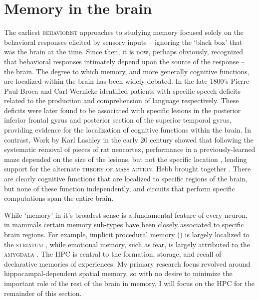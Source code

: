 \section{Memory in the brain}\label{sec:intro:memory:structure}
The earliest \textsc{behaviorist} approaches to studying memory focused solely on the behavioral responses elicited by sensory inputs -- ignoring the `black box' that was the brain at the time.
Since then, it is now, perhaps obviously, recognized that behavioral responses intimately depend upon the source of the response -- the brain.
The degree to which memory, and more generally cognitive functions, are localized within the brain has been widely debated.
In the late 1800's Pierre Paul Broca and Carl Wernicke identified patients with specific speech deficits related to the production and comprehension of language respectively.
These deficits were later found to be associated with specific lesions in the posterior inferior frontal gyrus and posterior section of the superior temporal gyrus, providing evidence for the localization of cognitive functions within the brain.
In contrast, Work by Karl Lashley in the early 20 century showed that following the systematic removal of pieces of rat neocortex, performance in a previously-learned maze depended on the size of the lesions, but not the specific location \citep{Lashley1929}, lending support for the alternate \textsc{theory of mass action}.
Hebb brought together \citep{Hebb1949}.
There are clearly cognitive functions that are localized to specific regions of the brain, but none of these function independently, and circuits that perform specific computations span the entire brain.

While `memory' in it's broadest sense is a fundamental feature of every neuron, in mammals certain memory sub-types have been closely associated to specific brain regions.
For example, implicit procedural memory () is largely localized to the \textsc{striatum} , while emotional memory, such as fear, is largely attributed to the \textsc{amygdala} \citep{LeDoux2000}.
The \ac{HPC} is central to the formation, storage, and recall of declarative memories of experiences.
My primary research focus revolved around hippocampal-dependent spatial memory, so with no desire to minimize the important role of the rest of the brain in memory, I will focus on the \ac{HPC} for the remainder of this section. 

